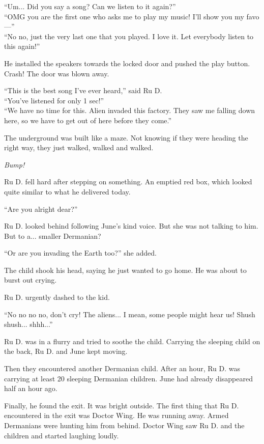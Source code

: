 ``Um... Did you say a song? Can we listen to it again?'' \\
``OMG you are the first one who asks me to play my music! I'll show you my favo—'' \\
``No no, just the very last one that you played. I love it. Let everybody listen to this again!''

He installed the speakers towards the locked door and pushed the play button.  \\
Crash! The door was blown away.

``This is the best song I've ever heard,'' said Ru D. \\
``You've listened for only 1 sec!'' \\
``We have no time for this. Alien invaded this factory. They saw me falling down here, so we have to get out of here before they come.''

The underground was built like a maze. Not knowing if they were heading the right way, they just walked, walked and walked. 

\emph{Bump!}

Ru D. fell hard after stepping on something. An emptied red box, which looked quite similar to what he delivered today. 

``Are you alright dear?''

Ru D. looked behind following June's kind voice. But she was not talking to him. But to a... smaller Dermanian?

``Or are you invading the Earth too?'' she added.

The child shook his head, saying he just wanted to go home. He was about to burst out crying. 

Ru D. urgently dashed to the kid.

``No no no no, don't cry! The aliens... I mean, some people might hear us! Shush shush... shhh...''

Ru D. was in a flurry and tried to soothe the child. Carrying the sleeping child on the back, Ru D. and June kept moving. 

Then they encountered another Dermanian child. After an hour, Ru D. was carrying at least 20 sleeping Dermanian children. June had already disappeared half an hour ago.

Finally, he found the exit. It was bright outside. The first thing that Ru D. encountered in the exit was Doctor Wing. He was running away. Armed Dermanians were hunting him from behind. Doctor Wing saw Ru D. and the children and started laughing loudly. 

